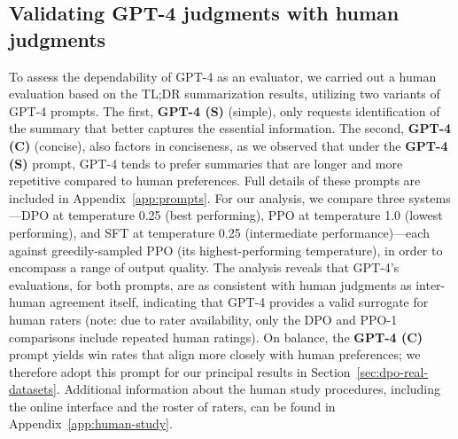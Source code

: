 \subsection{Validating GPT-4 judgments with human judgments}
\label{sec:human-judgments}
To assess the dependability of GPT-4 as an evaluator, we carried out a human evaluation based on the TL;DR summarization results, utilizing two variants of GPT-4 prompts. The first, \textbf{GPT-4 (S)} (simple), only requests identification of the summary that better captures the essential information. The second, \textbf{GPT-4 (C)} (concise), also factors in conciseness, as we observed that under the \textbf{GPT-4 (S)} prompt, GPT-4 tends to prefer summaries that are longer and more repetitive compared to human preferences. Full details of these prompts are included in Appendix~\ref{app:prompts}. For our analysis, we compare three systems—DPO at temperature 0.25 (best performing), PPO at temperature 1.0 (lowest performing), and SFT at temperature 0.25 (intermediate performance)—each against greedily-sampled PPO (its highest-performing temperature), in order to encompass a range of output quality. The analysis reveals that GPT-4's evaluations, for both prompts, are as consistent with human judgments as inter-human agreement itself, indicating that GPT-4 provides a valid surrogate for human raters (note: due to rater availability, only the DPO and PPO-1 comparisons include repeated human ratings). On balance, the \textbf{GPT-4 (C)} prompt yields win rates that align more closely with human preferences; we therefore adopt this prompt for our principal results in Section~\ref{sec:dpo-real-datasets}. Additional information about the human study procedures, including the online interface and the roster of raters, can be found in Appendix~\ref{app:human-study}.

